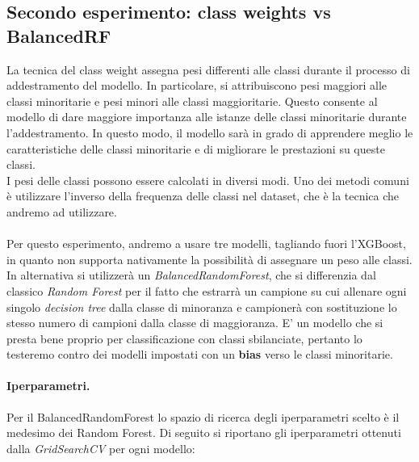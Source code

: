 \subsection{Secondo esperimento: class weights vs BalancedRF}
\noindent La tecnica del class weight assegna pesi differenti alle classi durante il processo di addestramento del modello. In particolare, si attribuiscono pesi maggiori alle classi minoritarie e pesi minori alle classi maggioritarie. Questo consente al modello di dare maggiore importanza alle istanze delle classi minoritarie durante l'addestramento. In questo modo, il modello sarà in grado di apprendere meglio le caratteristiche delle classi minoritarie e di migliorare le prestazioni su queste classi.\\
I pesi delle classi possono essere calcolati in diversi modi. Uno dei metodi comuni è utilizzare l'inverso della frequenza delle classi nel dataset, che è la tecnica che andremo ad utilizzare.\\ \\ Per questo esperimento, andremo a usare tre modelli, tagliando fuori l'XGBoost, in quanto non supporta nativamente la possibilità di assegnare un peso alle classi.\\ In alternativa si utilizzerà un \textit{BalancedRandomForest}, che si differenzia dal classico \textit{Random Forest} per il fatto che estrarrà un campione su cui allenare ogni singolo \textit{decision tree} dalla classe di minoranza e campionerà con sostituzione lo stesso numero di campioni dalla classe di maggioranza. E' un modello che si presta bene proprio per classificazione con classi sbilanciate, pertanto lo testeremo contro dei modelli impostati con un \textbf{bias} verso le classi minoritarie.

\paragraph{Iperparametri.} Per il BalancedRandomForest lo spazio di ricerca degli iperparametri scelto è il medesimo dei Random Forest. Di seguito si riportano gli iperparametri ottenuti dalla \textit{GridSearchCV} per ogni modello:

